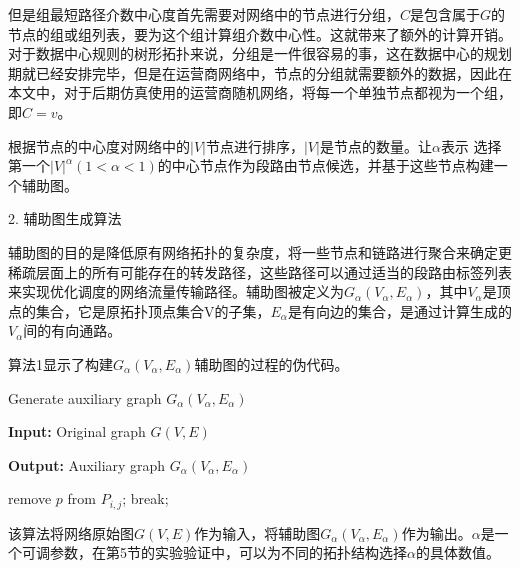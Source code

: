 但是组最短路径介数中心度首先需要对网络中的节点进行分组，$C$是包含属于$G$的节点的组或组列表，要为这个组计算组介数中心性。这就带来了额外的计算开销。对于数据中心规则的树形拓扑来说，分组是一件很容易的事，这在数据中心的规划期就已经安排完毕，但是在运营商网络中，节点的分组就需要额外的数据，因此在本文中，对于后期仿真使用的运营商随机网络，将每一个单独节点都视为一个组，即$C=v$。

根据节点的中心度对网络中的$|V|$节点进行排序，$|V|$是节点的数量。让$\alpha$表示 选择第一个${|V|}^\alpha(1<\alpha<1)$的中心节点作为段路由节点候选，并基于这些节点构建一个辅助图。

2. 辅助图生成算法

辅助图的目的是降低原有网络拓扑的复杂度，将一些节点和链路进行聚合来确定更稀疏层面上的所有可能存在的转发路径，这些路径可以通过适当的段路由标签列表来实现优化调度的网络流量传输路径。辅助图被定义为$G_\alpha\left(V_\alpha,E_\alpha\right)$，其中$V_\alpha$是顶点的集合，它是原拓扑顶点集合V的子集，$E_\alpha$是有向边的集合，是通过计算生成的$V_\alpha$间的有向通路。

算法1显示了构建$G_\alpha\left(V_\alpha,E_\alpha\right)$辅助图的过程的伪代码。

\begin{algorithm}[h]
\setlength{\abovedisplayskip}{8pt}
\setlength{\belowdisplayskip}{2pt}

\caption{Generate auxiliary graph  $G_\alpha(V_\alpha,E_\alpha)$}  
\hspace*{0.02in} {\bf Input:} 
    Original graph $G(V,E)$
    
\hspace*{0.02in} {\bf Output:}
Auxiliary graph  $G_\alpha(V_\alpha,E_\alpha)$
 
\begin{algorithmic}[1]
\STATE remove $p$ from $P_{i,j}$;
\STATE break;
\ENDIF
\ENDFOR
\ENDFOR
{}
\ELSE
{}
\ENDIF
\ENDFOR 
\end{algorithmic}

\end{algorithm}

该算法将网络原始图$G(V, E)$作为输入，将辅助图$G_\alpha\left(V_\alpha,E_\alpha\right)$作为输出。$\alpha$是一个可调参数，在第5节的实验验证中，可以为不同的拓扑结构选择$\alpha$的具体数值。

